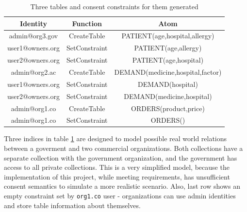 \documentclass[12pt]{article}
\begin{document}
    \begin{table}[H]
        \center
        \scriptsize
        \begin{tabular}{ c|c|c }
            Identity & Function & Atom \\
            \hline
            admin@org3.gov & CreateTable & PATIENT(age,hospital,allergy) \\
            user1@owners.org & SetConstraint & PATIENT(age,allergy) \\
            user2@owners.org & SetConstraint & PATIENT(age,hospital) \\
            \hline
            admin@org2.ac & CreateTable & DEMAND(medicine,hospital,factor)  \\
            user1@owners.org & SetConstraint & DEMAND(hospital)  \\
            user2@owners.org & SetConstraint & DEMAND(medicine,hospital)  \\
            \hline
            admin@org1.co & CreateTable & ORDERS(product,price) \\
            admin@org1.co & SetConstraint & ORDERS()
        \end{tabular}
        \caption{Three tables and consent constraints for them generated}
        \label{table:indices}
    \end{table}

    Three indices in table \ref{table:indices} are designed to model possible real world relations between a goverment and two commercial organizations. Both collections have a separate collection with the government organization, and the government has access to all private collections. This is a very simplified model, because the implementation of this project, while meeting requirements, has unsufficient consent semantics to simulate a more realistic scenario. Also, last row shows an empty constraint set by \lstinline{org1.co} user - organizations can use admin identities and store table information about themselves.
\end{document}
